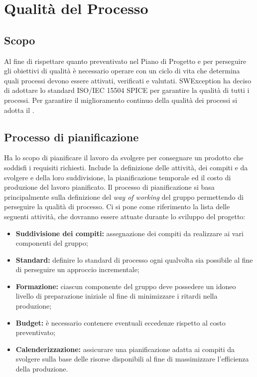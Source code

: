\section{Qualità del Processo}
\subsection{Scopo}
Al fine di rispettare quanto preventivato nel Piano di Progetto e per perseguire gli obiettivi di qualità è necessario operare con un ciclo di vita che determina quali processi
devono essere attivati, verificati e valutati. SWException ha deciso di adottare lo standard ISO/IEC 15504 SPICE per garantire la qualità di tutti i processi.
Per garantire il miglioramento continuo della qualità dei processi si adotta il \textit{}. 

\subsection{Processo di pianificazione}
Ha lo scopo di pianificare il lavoro da svolgere per consegnare un prodotto che soddisfi i requisiti richiesti. Include la definizione delle attività, dei compiti e da svolgere 
e della loro suddivisione, la pianificazione temporale ed il costo di produzione del lavoro pianificato.
Il processo di pianificazione si basa principalmente sulla definizione del \textit{way of working} del gruppo permettendo di perseguire la qualità di processo.
Ci si pone come riferimento la lista delle seguenti attività, che dovranno essere attuate durante lo sviluppo del progetto:

\begin{itemize}
    \item \textbf{Suddivisione dei compiti:} assegnazione dei compiti da realizzare ai vari componenti del gruppo;
    \item \textbf{Standard:} definire lo standard di processo ogni qualvolta sia possibile al fine di perseguire un approccio incrementale;
    \item \textbf{Formazione:} ciascun componente del gruppo deve possedere un idoneo  livello di preparazione iniziale al fine di minimizzare i ritardi nella produzione;
    \item \textbf{Budget:} è necessario contenere eventuali eccedenze rispetto al costo preventivato;
    \item \textbf{Calenderizzazione:} assicurare una pianificazione adatta ai compiti da svolgere sulla base delle risorse disponibili al fine di massimizzare l'efficienza della produzione.
\end{itemize}

